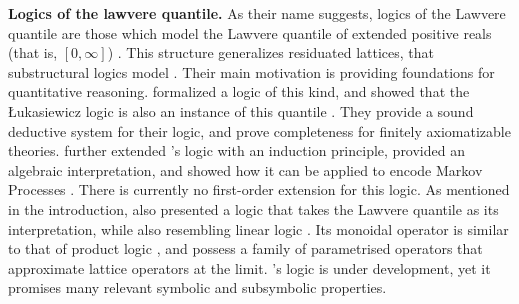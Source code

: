 
\textbf{Logics of the lawvere quantile.} As their name suggests, logics of the Lawvere quantile are those which model the Lawvere quantile of extended positive reals (that is, $[0,\infty]$)  \citep{bacci2023propositional}. This structure generalizes residuated lattices, that substructural logics model \citep{galatos2007residuated}. Their main motivation is providing foundations for quantitative reasoning. \citeauthor{bacci2023propositional} formalized a logic of this kind, and showed that the Łukasiewicz logic is also an instance of this quantile \citep{bacci2023propositional, bacci2024polynomial}. They provide a sound deductive system for their logic, and prove completeness for finitely axiomatizable theories. \citeauthor{bacci2025induction} further extended \citeauthor{bacci2024polynomial}'s logic with an induction principle, provided an algebraic interpretation, and showed how it can be applied to encode Markov Processes \citep{bacci2025induction}. There is currently no first-order extension for this logic. As mentioned in the introduction, \citeauthor{capucci2024quantifiers} also presented a logic that takes the Lawvere quantile as its interpretation, while also resembling linear logic \citep{agliano2025algebraic}. Its monoidal operator is similar to that of product logic \cite{cintula2011handbook, prooffuzzy}, and possess a family of parametrised operators that approximate lattice operators at the limit. \citeauthor{capucci2024quantifiers}'s logic is under development, yet it promises many relevant symbolic and subsymbolic properties.

